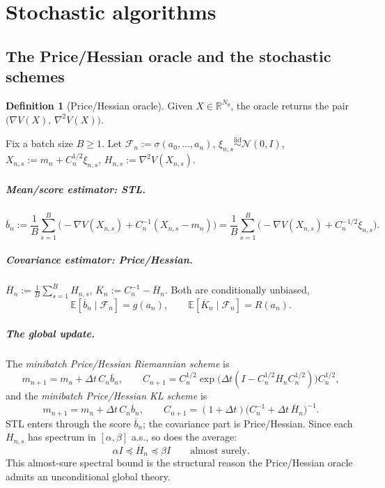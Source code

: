 \documentclass[11pt]{article}
\theoremstyle{plain}
\theoremstyle{definition}
\newtheorem{definition}[definition]{Definition}
\theoremstyle{remark}
\newcommand{\R}{\mathbb{R}}
\newcommand{\N}{\mathcal{N}}
\newcommand{\E}{\mathbb{E}}
\newcommand{\Id}{I}
\newcommand{\Fil}{\mathcal{F}}
\begin{document}
\section{Stochastic algorithms}
\label{sec:stoch}

\subsection{The Price/Hessian oracle and the stochastic schemes}
\label{sec:stoch-schemes}

\begin{definition}[Price/Hessian oracle]
\label{def:oracle}
Given $X\in\R^{N_\theta}$, the oracle returns the pair $\bigl(\nabla V(X),\,\nabla^2V(X)\bigr)$.
\end{definition}

Fix a batch size $B\geq1$. Let $\Fil_n:=\sigma(a_0,\ldots,a_n)$, $\xi_{n,s}\overset{\text{iid}}{\sim}\N(0,\Id)$,
$X_{n,s}:=m_n+C_n^{1/2}\xi_{n,s}$, $H_{n,s}:=\nabla^2V(X_{n,s})$.

\subparagraph{Mean/score estimator: STL.}
\begin{equation}
\label{eq:STL-score}
    \overline b_n:=\frac1B\sum_{s=1}^B\bigl(-\nabla V(X_{n,s})+C_n^{-1}(X_{n,s}-m_n)\bigr)
    =\frac1B\sum_{s=1}^B\bigl(-\nabla V(X_{n,s})+C_n^{-1/2}\xi_{n,s}\bigr).
\end{equation}

\subparagraph{Covariance estimator: Price/Hessian.}
$\overline H_n:=\tfrac1B\sum_{s=1}^BH_{n,s}$, $\overline K_n:=C_n^{-1}-\overline H_n$. Both are
conditionally unbiased,
\begin{equation}
\label{eq:STL-unbiased}
    \E[\overline b_n\mid\Fil_n]=g(a_n),
    \qquad
    \E[\overline K_n\mid\Fil_n]=R(a_n).
\end{equation}

\subparagraph{The global update.}
The \emph{minibatch Price/Hessian Riemannian scheme} is
\begin{equation}
\label{eq:Riem-STL}
    m_{n+1}=m_n+\Delta t\,C_n\overline b_n,
    \qquad
    C_{n+1}=C_n^{1/2}\exp\bigl(\Delta t(\Id-C_n^{1/2}\overline H_nC_n^{1/2})\bigr)C_n^{1/2},
\end{equation}
and the \emph{minibatch Price/Hessian KL scheme} is
\begin{equation}
\label{eq:KL-STL}
    m_{n+1}=m_n+\Delta t\,C_n\overline b_n,
    \qquad
    C_{n+1}=(1+\Delta t)\bigl(C_n^{-1}+\Delta t\,\overline H_n\bigr)^{-1}.
\end{equation}
STL enters through the score $\overline b_n$; the covariance part is Price/Hessian. Since each
$H_{n,s}$ has spectrum in $[\alpha,\beta]$ a.s., so does the average:
\begin{equation}
\label{eq:pathwise-Hess}
    \alpha\Id\preceq\overline H_n\preceq\beta\Id\qquad\text{almost surely.}
\end{equation}
This almost-sure spectral bound is the structural reason the Price/Hessian oracle admits an
unconditional global theory.
\end{document}
